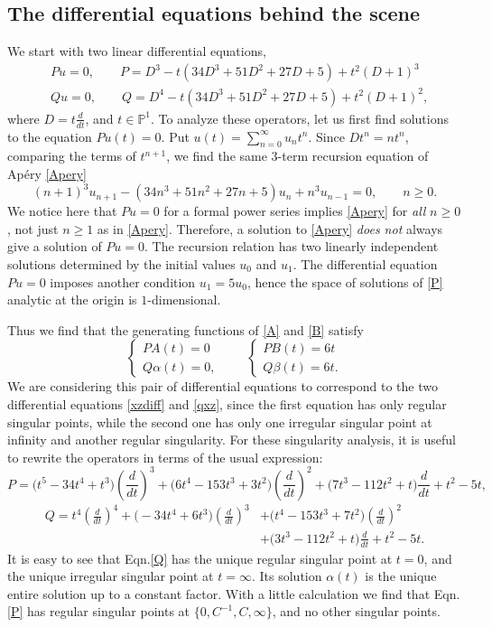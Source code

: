 \documentclass{amsart}
\theoremstyle{definition}
\numberwithin{equation}{section}
\numberwithin{figure}{section}
\def\a{\alpha}
\def\b{\beta}
\newcommand{\be}{\begin{equation}}
\newcommand{\ee}{\end{equation}}
\newcommand{\bP}{{\mathbb{P}}}
\begin{document}
\subsection{The differential equations behind the scene}
We start with two linear differential equations,
\begin{align}
\label{P}
&Pu=0, \qquad P= D^3-t(34D^3+51D^2+27D +5)+t^2(D+1)^3\\
\label{Q}
&Qu=0, \qquad Q=D^4-t(34D^3+51D^2+27D +5)+t^2(D+1)^2,
\end{align}
where $D=t \frac{d}{dt}$, and $t\in \bP^1$. 
To analyze these operators, let us first find solutions to the equation
$Pu(t)=0$. Put $u(t)=\sum_{n=0}^\infty u_n t^n$. Since
$Dt^n=nt^n$,   comparing the terms of $t^{n+1}$,
we find  
the same $3$-term recursion equation of Ap\'ery \eqref{Apery}
$$
(n+1)^3 u_{n+1} -(34n^3+51n^2+27n+5)u_n +n^3 u_{n-1}=0, \qquad n\ge 0.
$$
We notice here that $Pu=0$ for a formal
power series implies \eqref{Apery} for \emph{all} $n\ge 0$, 
not just $n\ge 1$ as in \eqref{Apery}. Therefore, a solution to \eqref{Apery} \emph{does not}
always give a solution of $Pu=0$. The recursion relation has two 
linearly independent solutions determined by the initial values
$u_0$ and $u_1$. The differential equation $Pu=0$ imposes another 
condition $u_1=5u_0$, hence the space of  solutions of \eqref{P}
analytic at the origin is $1$-dimensional.

Thus we find that the generating functions of  \eqref{A} and  \eqref{B} satisfy
\be
\label{ABdiff}
\begin{cases}
PA(t)=0
\\ Q\a(t)=0,
\end{cases} \qquad
\begin{cases}
PB(t)=6t
\\ Q\b(t)=6t.
\end{cases}
\ee
We are considering this pair of differential equations
to 
correspond to the two differential equations \eqref{xzdiff} and \eqref{qxz},
since the first equation has only regular singular points, while the second 
one has only one  irregular singular point at infinity and another regular singularity.
For these singularity analysis, it is useful to rewrite the operators in
terms of the usual expression:
$$
P=  \big(t^5-34t^4+t^3\big)\left(\frac{d}{dt}\right)^3 +
\big(6t^4-153t^3+3t^2\big)\left(\frac{d}{dt}\right)^2+
\big(7t^3-112t^2+t\big)\frac{d}{dt}
+t^2-5t,
$$
\begin{align*}
Q=t^4\left(\frac{d}{dt}\right)^4+
\big(-34t^4+6t^3\big)\left(\frac{d}{dt}\right)^3 &+
\big(t^4-153t^3+7t^2\big)\left(\frac{d}{dt}\right)^2
\\
& +
\big(3t^3-112t^2+t\big)\frac{d}{dt}
+t^2-5t.
\end{align*}
It is easy to see that Eqn.\eqref{Q} has the unique regular singular
point at $t=0$, and the unique irregular singular point at $t=\infty$. 
Its solution $\a(t)$ is the unique entire solution up to a constant factor. 
With a little calculation we  find that Eqn.\eqref{P} has 
regular singular points at $\{0, C^{-1}, C, \infty\}$, 
and no other singular points.
\end{document}
